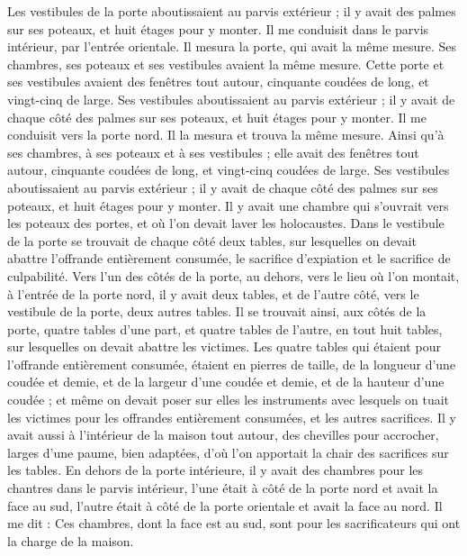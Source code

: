 \begin{multicols}{2}
Les vestibules de la porte aboutissaient au parvis extérieur ; il y avait des palmes sur ses poteaux, et huit étages pour y monter.
Il me conduisit dans le parvis intérieur, par l’entrée orientale. Il mesura la porte, qui avait la même mesure.
Ses chambres, ses poteaux et ses vestibules avaient la même mesure. Cette porte et ses vestibules avaient des fenêtres tout autour, cinquante coudées de long, et vingt-cinq de large.
Ses vestibules aboutissaient au parvis extérieur ; il y avait de chaque côté des palmes sur ses poteaux, et huit étages pour y monter.
Il me conduisit vers la porte nord. Il la mesura et trouva la même mesure.
Ainsi qu’à ses chambres, à ses poteaux et à ses vestibules ; elle avait des fenêtres tout autour, cinquante coudées de long, et vingt-cinq coudées de large.
Ses vestibules aboutissaient au parvis extérieur ; il y avait de chaque côté des palmes sur ses poteaux, et huit étages pour y monter.
Il y avait une chambre qui s’ouvrait vers les poteaux des portes, et où l’on devait laver les holocaustes.
Dans le vestibule de la porte se trouvait de chaque côté deux tables, sur lesquelles on devait abattre l’offrande entièrement consumée, le sacrifice d’expiation et le sacrifice de culpabilité.
Vers l'un des côtés de la porte, au dehors, vers le lieu où l'on montait, à l'entrée de la porte nord, il y avait deux tables, et de l'autre côté, vers le vestibule de la porte, deux autres tables.
Il se trouvait ainsi, aux côtés de la porte, quatre tables d’une part, et quatre tables de l’autre, en tout huit tables, sur lesquelles on devait abattre les victimes.
Les quatre tables qui étaient pour l’offrande entièrement consumée, étaient en pierres de taille, de la longueur d'une coudée et demie, et de la largeur d'une coudée et demie, et de la hauteur d'une coudée ; et même on devait poser sur elles les instruments avec lesquels on tuait les victimes pour les offrandes entièrement consumées, et les autres sacrifices.
Il y avait aussi à l’intérieur de la maison tout autour, des chevilles pour accrocher, larges d'une paume, bien adaptées, d'où l’on apportait la chair des sacrifices sur les tables.
En dehors de la porte intérieure, il y avait des chambres pour les chantres dans le parvis intérieur, l’une était à côté de la porte nord et avait la face au sud, l’autre était à côté de la porte orientale et avait la face au nord.
Il me dit : Ces chambres, dont la face est au sud, sont pour les sacrificateurs qui ont la charge de la maison.

\end{multicols}
